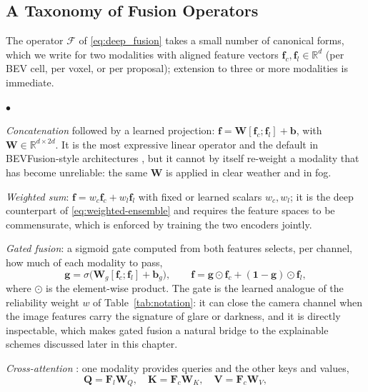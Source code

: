 \documentclass[graybox,envcountchap]{style/SNmono}
\newenvironment{list4a}{
  \begin{list}{$\bullet$}{
      \setlength{\itemsep}{0.05cm}
      \setlength{\labelsep}{0.2cm}
      \setlength{\labelwidth}{0.3cm}
      \setlength{\parsep}{0in}
      \setlength{\parskip}{0in}
      \setlength{\topsep}{0in}
      \setlength{\partopsep}{0in}
      \setlength{\leftmargin}{0.16in}}}
      {\end{list}}
\begin{document}
\subsection{A Taxonomy of Fusion Operators}
\label{subsec:fusion-operators}
The operator $\mathcal{F}$ of \eqref{eq:deep_fusion} takes a small number of canonical forms, which we write for two modalities with aligned feature vectors $\mathbf{f}_c,\mathbf{f}_l\in\mathbb{R}^{d}$ (per BEV cell, per voxel, or per proposal); extension to three or more modalities is immediate.
\begin{list4a}
    \item \emph{Concatenation} followed by a learned projection: $\mathbf{f}=\mathbf{W}[\mathbf{f}_c;\mathbf{f}_l]+\mathbf{b}$, with $\mathbf{W}\in\mathbb{R}^{d\times 2d}$. It is the most expressive linear operator and the default in BEVFusion-style architectures \cite{liu2023_bevfusion}, but it cannot by itself re-weight a modality that has become unreliable: the same $\mathbf{W}$ is applied in clear weather and in fog.
    \item \emph{Weighted sum}: $\mathbf{f}=w_c\mathbf{f}_c+w_l\mathbf{f}_l$ with fixed or learned scalars $w_c,w_l$; it is the deep counterpart of \eqref{eq:weighted-ensemble} and requires the feature spaces to be commensurate, which is enforced by training the two encoders jointly.
    \item \emph{Gated fusion}: a sigmoid gate computed from both features selects, per channel, how much of each modality to pass,
    \begin{equation}
    \mathbf{g}=\sigma\!\big(\mathbf{W}_g[\mathbf{f}_c;\mathbf{f}_l]+\mathbf{b}_g\big),\qquad
    \mathbf{f}=\mathbf{g}\odot\mathbf{f}_c+(\mathbf{1}-\mathbf{g})\odot\mathbf{f}_l ,
    \label{eq:gated-fusion}
    \end{equation}
    where $\odot$ is the element-wise product. The gate is the learned analogue of the reliability weight $w$ of Table~\ref{tab:notation}: it can close the camera channel when the image features carry the signature of glare or darkness, and it is directly inspectable, which makes gated fusion a natural bridge to the explainable schemes discussed later in this chapter.
    \item \emph{Cross-attention} \cite{vaswani2017_attention}: one modality provides queries and the other keys and values,
    \begin{equation}
    \mathbf{Q}=\mathbf{F}_l\mathbf{W}_Q,\quad \mathbf{K}=\mathbf{F}_c\mathbf{W}_K,\quad \mathbf{V}=\mathbf{F}_c\mathbf{W}_V,\qquad

\end{equation}
\end{list4a}
\end{document}
